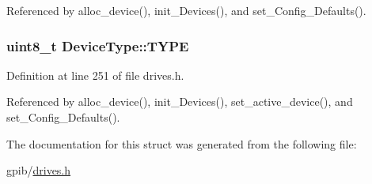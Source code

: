 Referenced by alloc\+\_\+device(), init\+\_\+\+Devices(), and set\+\_\+\+Config\+\_\+\+Defaults().

\subsubsection[{\texorpdfstring{T\+Y\+PE}{TYPE}}]{\setlength{\rightskip}{0pt plus 5cm}uint8\+\_\+t Device\+Type\+::\+T\+Y\+PE}\hypertarget{structDeviceType_acee5219162b6f47a9423b2086d127ede}{}\label{structDeviceType_acee5219162b6f47a9423b2086d127ede}


Definition at line 251 of file drives.\+h.



Referenced by alloc\+\_\+device(), init\+\_\+\+Devices(), set\+\_\+active\+\_\+device(), and set\+\_\+\+Config\+\_\+\+Defaults().



The documentation for this struct was generated from the following file\+:\begin{DoxyCompactItemize}
\item 
gpib/\hyperlink{drives_8h}{drives.\+h}\end{DoxyCompactItemize}

